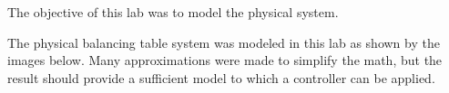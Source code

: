 The objective of this lab was to model the physical system.

The physical balancing table system was modeled in this lab as shown by the images below. Many approximations were made to simplify the math, but the result should provide a sufficient model to which a controller can be applied.

      